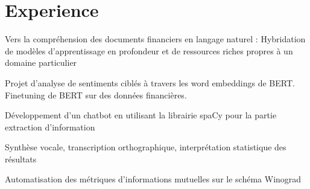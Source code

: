 \section{Experience}

\vspace{\topsep}
\begin{tightemize}
\item Vers la compréhension des documents financiers en langage naturel : Hybridation de modèles d'apprentissage en profondeur et de ressources riches propres à un domaine particulier
\end{tightemize}
\sectionsep


\vspace{\topsep}
\begin{tightemize}
\item Projet d'analyse de sentiments ciblés à travers les word embeddings de BERT. Finetuning de BERT sur des données financières.
\end{tightemize}
\sectionsep


\vspace{\topsep}
\begin{tightemize}
\item Développement d'un chatbot en utilisant la librairie spaCy pour la partie extraction d'information
\end{tightemize}
\sectionsep

\vspace{\topsep}
\begin{tightemize}
\item Synthèse vocale, transcription orthographique, interprétation statistique des résultats
\end{tightemize}
\sectionsep

\vspace{\topsep}
\begin{tightemize}
\item Automatisation des métriques d'informations mutuelles sur le schéma Winograd
\end{tightemize}
\sectionsep